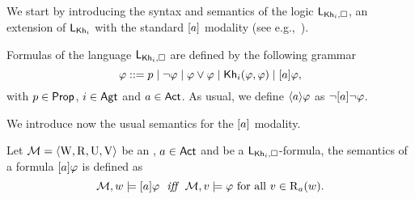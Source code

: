 We start by introducing the syntax and semantics of the logic $\mathsf{L}_{{\sf Kh}_i,\square}$,  an extension of $\mathsf{L}_{{\sf Kh}_i}$ with the standard $[a]$ modality (see e.g.,~\cite{HML,mlbook}).

\medskip

\begin{definition}\label{def:khimlsyntax}
Formulas of the language $\mathsf{L}_{{\sf Kh}_i,\square}$ are defined by the following grammar
\[
\varphi ::= p \mid \neg\varphi \mid \varphi\vee\varphi \mid {\sf Kh}_i(\varphi,\varphi) \mid [a]\varphi,
\]
with $p \in {\rm \sf Prop}$, $i \in {\rm \sf Agt}$ and $a \in {\rm \sf Act}$.
As usual, we define $\langle a \rangle\varphi$ as $\neg[a]\neg\varphi$. %
\end{definition}

\medskip

We introduce now the usual semantics for the $[a]$ modality.

\medskip

\begin{definition}\label{def:khimlsemantics}
Let $\mathcal{M} = \langle \operatorname{W}, \operatorname{R}, \operatorname{U}, \operatorname{V} \rangle$ be an \ults, $a \in {\rm \sf Act}$ and  be a $\mathsf{L}_{{\sf Kh}_i,\square}$-formula, the semantics of a formula $[a]\varphi$ is defined as
\[
\modults,w \models \mlbox{a}\varphi \ \ \iff \ \ \modults,v \models \varphi \mbox{ for all }v \in \R_a(w).
\]
\end{definition}

